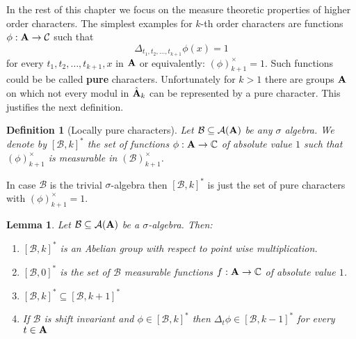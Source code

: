\documentclass [11pt] {article}
\newtheorem{lemma}{Lemma}[section]
\newtheorem{definition}{Definition}[section]
\def\bA{{\bf A}}
\begin{document}
In the rest of this chapter we focus on the measure theoretic properties of higher order characters.
The simplest examples for $k$-th order characters are functions $\phi:\bA\rightarrow\mathcal{C}$ such that
$$\Delta_{t_1,t_2,\dots,t_{k+1}}\phi(x)=1$$
for every $t_1,t_2,\dots,t_{k+1},x$ in $\bA$ or equivalently: $(\phi)_{k+1}^\times=1$.
Such functions could be be called {\bf pure} characters. 
Unfortunately for $k>1$ there are groups $\bA$ on which not every modul in $\hat{\bA}_k$ can be represented by a pure character.
This justifies the next definition.

\begin{definition}[Locally pure characters] Let $\mathcal{B}\subseteq\mathcal{A}(\bA)$ be any $\sigma$ algebra.
We denote by $[\mathcal{B},k]^*$ the set of functions $\phi:\bA\rightarrow\mathbb{C}$ of absolute value $1$ such that $(\phi)^\times_{k+1}$ is measurable in $(\mathcal{B})_{k+1}^\times$.  
\end{definition}

In case $\mathcal{B}$ is the trivial $\sigma$-algebra then $[\mathcal{B},k]^*$ is just the set of pure characters with $(\phi)_{k+1}^\times=1$.

\begin{lemma}\label{pureprop} Let $\mathcal{B}\subseteq\mathcal{A}(\bA)$ be a $\sigma$-algebra. Then: \begin{enumerate}
\item $[\mathcal{B},k]^*$ is an Abelian group with respect to point wise multiplication.
\item $[\mathcal{B},0]^*$ is the set of $\mathcal{B}$ measurable functions $f:\bA\rightarrow \mathbb{C}$ of absolute value $1$.
\item $[\mathcal{B},k]^*\subseteq [\mathcal{B},k+1]^*$
\item If $\mathcal{B}$ is shift invariant and $\phi\in[\mathcal{B},k]^*$ then $\Delta_t\phi\in[\mathcal{B},k-1]^*$ for every $t\in\bA$
\end{enumerate}
\end{lemma}
\end{document}

